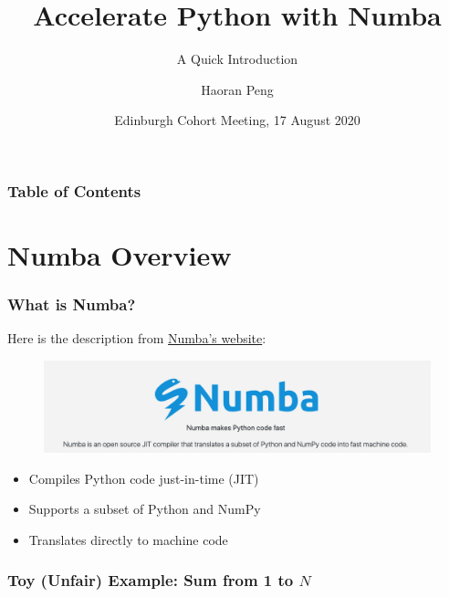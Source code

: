 \documentclass{beamer}
\title{Accelerate Python with Numba}
\subtitle{A Quick Introduction}
\author{Haoran Peng}
\date{Edinburgh Cohort Meeting, 17 August 2020}
\newenvironment{code}{\VerbatimEnvironment\begin{verbatim}}{\end{verbatim}}
\begin{document}
\frame{\titlepage}


\begin{frame}
\frametitle{Table of Contents}
\tableofcontents
\end{frame}
\section{Numba Overview}

\begin{frame}
\frametitle{What is Numba?}
Here is the description from \href{http://numba.pydata.org/}{Numba's website}:
\begin{figure}
\centering
\includegraphics[width=\textwidth]{numba-official}
\end{figure}\pause
\begin{itemize}
\item<1-> Compiles Python code just-in-time (JIT)
\item<3-> Supports a subset of Python and NumPy
\item<4-> Translates directly to machine code
\end{itemize}
\end{frame}

\begin{frame}[fragile]
\frametitle{Toy (Unfair) Example: Sum from 1 to $N$}
\end{frame}
\end{document}

